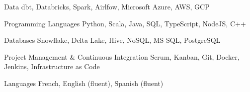 \begin{cvskills}

	\cvskill
	{Data}
	{dbt, Databricks, Spark, Airlfow, Microsoft Azure, AWS, GCP}
	
	\cvskill
	{Programming Languages}
	{Python, Scala, Java, SQL, TypeScript, NodeJS, C++}
	
	\cvskill
	{Databases}
	{Snowflake, Delta Lake, Hive, NoSQL, MS SQL, PostgreSQL}
	
	\cvskill
	{Project Management \& Continuous Integration}
	{Scrum, Kanban, Git, Docker, Jenkins, Infrastructure as Code}
	
	\cvskill
	{Languages}
	{French, English (fluent), Spanish (fluent)}
	
\end{cvskills}